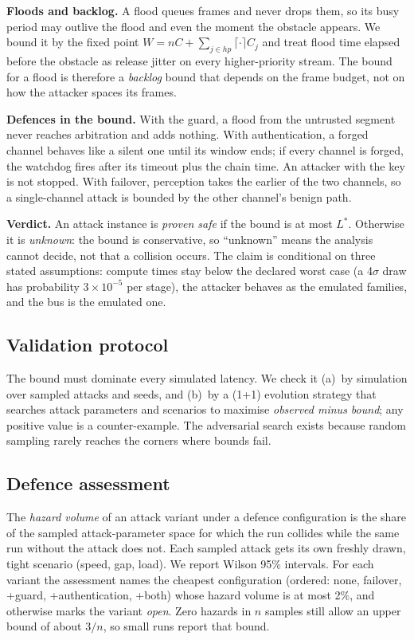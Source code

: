 \documentclass[conference]{IEEEtran}
\begin{document}
\textbf{Floods and backlog.} A flood queues frames and never drops them, so its busy period may outlive the flood and even the moment the obstacle appears. We bound it by the fixed point $W=nC+\sum_{j\in hp}\lceil\cdot\rceil C_j$ and treat flood time elapsed before the obstacle as release jitter on every higher-priority stream. The bound for a flood is therefore a \emph{backlog} bound that depends on the frame budget, not on how the attacker spaces its frames.

\textbf{Defences in the bound.} With the guard, a flood from the untrusted segment never reaches arbitration and adds nothing. With authentication, a forged channel behaves like a silent one until its window ends; if every channel is forged, the watchdog fires after its timeout plus the chain time. An attacker with the key is not stopped. With failover, perception takes the earlier of the two channels, so a single-channel attack is bounded by the other channel's benign path.

\textbf{Verdict.} An attack instance is \emph{proven safe} if the bound is at most $L^\ast$. Otherwise it is \emph{unknown}: the bound is conservative, so ``unknown'' means the analysis cannot decide, not that a collision occurs. The claim is conditional on three stated assumptions: compute times stay below the declared worst case (a 4$\sigma$ draw has probability $3\times10^{-5}$ per stage), the attacker behaves as the emulated families, and the bus is the emulated one.

\subsection{Validation protocol}
The bound must dominate every simulated latency. We check it (a)~by simulation over sampled attacks and seeds, and (b)~by a (1+1) evolution strategy that searches attack parameters and scenarios to maximise \emph{observed minus bound}; any positive value is a counter-example. The adversarial search exists because random sampling rarely reaches the corners where bounds fail.

\subsection{Defence assessment}
The \emph{hazard volume} of an attack variant under a defence configuration is the share of the sampled attack-parameter space for which the run collides while the same run without the attack does not. Each sampled attack gets its own freshly drawn, tight scenario (speed, gap, load). We report Wilson 95\% intervals. For each variant the assessment names the cheapest configuration (ordered: none, failover, +guard, +authentication, +both) whose hazard volume is at most 2\%, and otherwise marks the variant \emph{open}. Zero hazards in $n$ samples still allow an upper bound of about $3/n$, so small runs report that bound.
\end{document}
